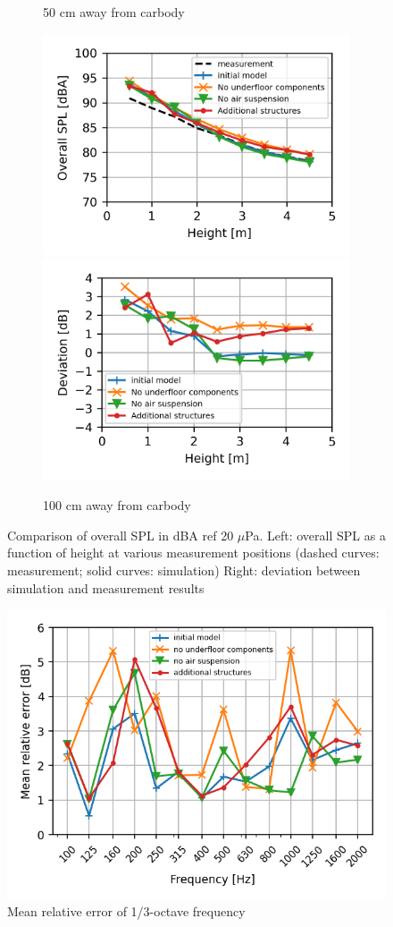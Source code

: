 \begin{figure}[H]
\begin{subfigure}[b]{\textwidth}
		\caption{50 cm away from carbody}
	\end{subfigure}
	\begin{subfigure}[b]{\textwidth}
		\centering
		\includegraphics[width=0.49\linewidth]{fig/chap5/geometry_variation/overall_SPL/pos_g.png}
		\includegraphics[width=0.49\linewidth]{fig/chap5/geometry_variation/overall_SPL/pos_g_deviation.png}
		\caption{100 cm away from carbody}
	\end{subfigure}
	\caption{Comparison of overall SPL in dBA ref 20 $\mu$Pa. Left: overall SPL as a function of height at various measurement positions (dashed curves: measurement; solid curves: simulation) Right: deviation between simulation and measurement results}
	\label{fig:overall_SPL_geometry}
\end{figure}


\begin{figure}[H]
	\centering
	\includegraphics[width=0.7\linewidth]{fig/chap5/geometry_variation/freq_spectrum/average_gap.png}
	\caption{Mean relative error of 1/3-octave frequency}
	\label{fig:gap_freq_spectrum_geometry}
\end{figure}

